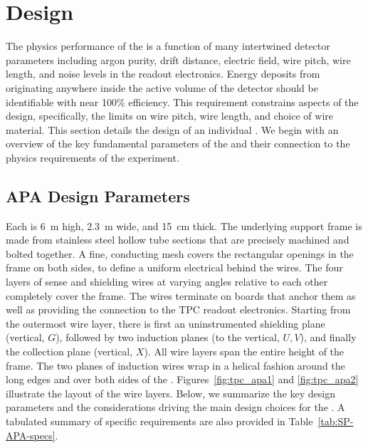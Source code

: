 \section{Design}
\label{sec:fdsp-apa-design}

The physics performance of the  is a function of many intertwined detector parameters including argon purity, drift distance, electric field, wire pitch, wire length, and noise levels in the readout electronics.  Energy deposits from  originating anywhere inside the active volume of the detector should be identifiable with near \num{100}\% efficiency.  This requirement constrains aspects of the  design, specifically, the limits on wire pitch, wire length, and choice of wire material.  This section details the design of an individual . We begin with an overview of the key fundamental parameters of the  and their connection to the physics requirements of the experiment. 


\subsection{APA Design Parameters}
\label{sec:fdsp-apa-design-overview}

Each  is \SI{6}{m} high, \SI{2.3}{m} wide, and \SI{15}{cm} thick.  The underlying support frame is made from stainless steel hollow tube sections that are precisely machined and bolted together. A fine, conducting mesh covers the rectangular openings in the frame on both sides, to define a uniform electrical  behind the wires. The four layers of sense and shielding wires at varying angles relative to each other completely cover the frame. The wires terminate on boards that anchor them as well as providing the connection to the TPC readout electronics. Starting from the outermost wire layer, there is first an uninstrumented shielding plane (vertical, $G$), followed by two induction planes (\apainducwireangle to the vertical, $U,V$), and finally the collection plane (vertical, $X$). All wire layers span the entire height of the  frame. The two planes of induction wires wrap in a helical fashion around the long edges and over both sides of the . Figures~\ref{fig:tpc_apa1} and \ref{fig:tpc_apa2} illustrate the layout of the wire layers.  Below, we summarize the key design parameters and the considerations driving the main design choices for the .  A tabulated summary of  specific requirements are also provided in Table~\ref{tab:SP-APA-specs}. %

